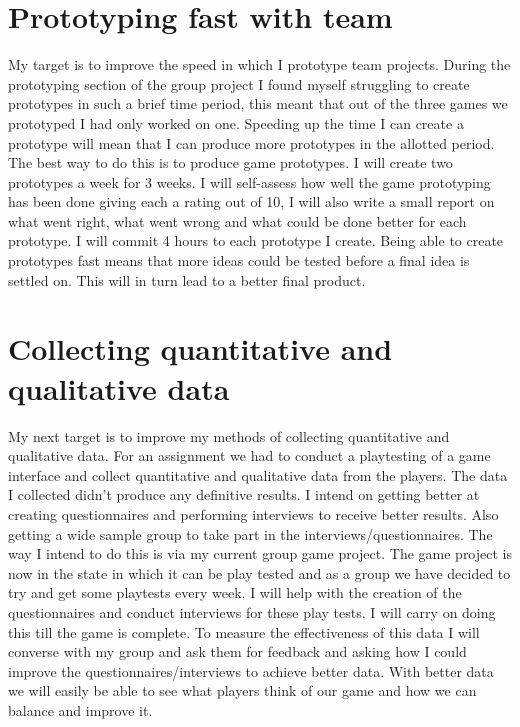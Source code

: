 \documentclass{scrartcl}
\begin{document}
\section{Prototyping fast with team}
My target is to improve the speed in which I prototype team projects. During the prototyping section of the group project I found myself struggling to create prototypes in such a brief time period, this meant that out of the three games we prototyped I had only worked on one. Speeding up the time I can create a prototype will mean that I can produce more prototypes in the allotted period.
\newline
\newline
The best way to do this is to produce game prototypes. I will create two prototypes a week for 3 weeks. I will self-assess how well the game prototyping has been done giving each a rating out of 10, I will also write a small report on what went right, what went wrong and what could be done better for each prototype. I will commit 4 hours to each prototype I create.
\newline
\newline
Being able to create prototypes fast means that more ideas could be tested before a final idea is settled on. This will in turn lead to a better final product.

\section{Collecting quantitative and qualitative data}
My next target is to improve my methods of collecting quantitative and qualitative data. For an assignment we had to conduct a playtesting of a game interface and collect quantitative and qualitative data from the players. The data I collected didn’t produce any definitive results. I intend on getting better at creating questionnaires and performing interviews to receive better results. Also getting a wide sample group to take part in the interviews/questionnaires.
\newline
\newline
The way I intend to do this is via my current group game project. The game project is now in the state in which it can be play tested and as a group we have decided to try and get some playtests every week. I will help with the creation of the questionnaires and conduct interviews for these play tests. I will carry on doing this till the game is complete. To measure the effectiveness of this data I will converse with my group and ask them for feedback and asking how I could improve the questionnaires/interviews to achieve better data.
\newline
\newline
With better data we will easily be able to see what players think of our game and how we can balance and improve it.
\end{document}
